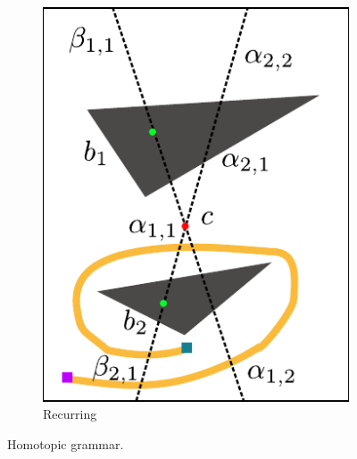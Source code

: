 \documentclass[letterpaper, 10 pt, conference]{ieeeconf}
\begin{document}
\begin{figure}
\begin{subfigure}[t]{0.4\linewidth}
		\includegraphics[width=\textwidth]{fig/recurring}
		\caption{Recurring}
		\label{fig:grammar:recurring}
	\end{subfigure}  
	\caption{Homotopic grammar.}
	\label{fig:grammar:a}
\end{figure}
\end{document}
